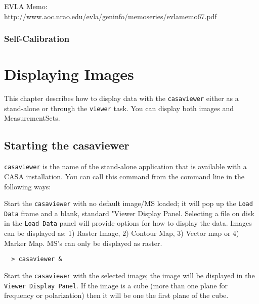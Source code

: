 \vspace{3mm}

EVLA Memo: http://www.aoc.nrao.edu/evla/geninfo/memoseries/evlamemo67.pdf

\subsection{Self-Calibration}
\label{subsection:synth.im.selfcal}

\vspace{3mm}


\chapter{Displaying Images}
\label{chapter:image.display}

This chapter describes how to display data with the {\tt casaviewer}
either as a stand-alone or through the {\tt viewer} task. You can
display both images and MeasurementSets.

\section{Starting the casaviewer}
\label{section:start.viewer}

{\tt casaviewer} is the name of the stand-alone application that is
available with a CASA installation. You can call this command from the
command line in the following ways:

Start the {\tt casaviewer} with no default image/MS loaded; it will
pop up the {\tt Load Data} frame and a blank, standard "Viewer Display
Panel. Selecting a file on disk in the {\tt Load Data} panel will
provide options for how to display the data. Images can be displayed
as: 1) Raster Image, 2) Contour Map, 3) Vector map or 4) Marker
Map.  MS's can only be displayed as raster.

\small
\begin{verbatim}
  > casaviewer &
\end{verbatim}
\normalsize

Start the {\tt casaviewer} with the selected image; the image will be
displayed in the {\tt Viewer Display Panel}. If the image is a cube (more
than one plane for frequency or polarization) then it will be one the
first plane of the cube.


